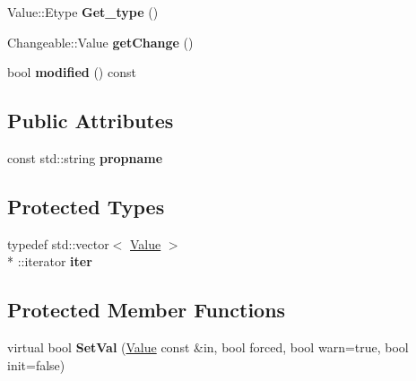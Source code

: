 \begin{DoxyCompactItemize}
\item 
\hypertarget{classProperty_ad4dfa2bc05c8f80dc4e554fde59538a4}{Value\-::\-Etype {\bfseries Get\-\_\-type} ()}\label{classProperty_ad4dfa2bc05c8f80dc4e554fde59538a4}

\item 
\hypertarget{classProperty_af38f129e65933845e4114835b5abdcd4}{Changeable\-::\-Value {\bfseries get\-Change} ()}\label{classProperty_af38f129e65933845e4114835b5abdcd4}

\item 
\hypertarget{classProperty_a6eb065e2efbbacb73c840001ac69c056}{bool {\bfseries modified} () const }\label{classProperty_a6eb065e2efbbacb73c840001ac69c056}

\end{DoxyCompactItemize}
\subsection*{Public Attributes}
\begin{DoxyCompactItemize}
\item 
\hypertarget{classProperty_a9b1096a84a64a0595ab8d79e836d3266}{const std\-::string {\bfseries propname}}\label{classProperty_a9b1096a84a64a0595ab8d79e836d3266}

\end{DoxyCompactItemize}
\subsection*{Protected Types}
\begin{DoxyCompactItemize}
\item 
\hypertarget{classProperty_a916e46cc6991261d59af94cd70b23953}{typedef std\-::vector$<$ \hyperlink{classValue}{Value} $>$\\*
\-::iterator {\bfseries iter}}\label{classProperty_a916e46cc6991261d59af94cd70b23953}

\end{DoxyCompactItemize}
\subsection*{Protected Member Functions}
\begin{DoxyCompactItemize}
\item 
\hypertarget{classProperty_ad2f4c65227ac4eec705847ecc662feef}{virtual bool {\bfseries Set\-Val} (\hyperlink{classValue}{Value} const \&in, bool forced, bool warn=true, bool init=false)}\label{classProperty_ad2f4c65227ac4eec705847ecc662feef}

\end{DoxyCompactItemize}
